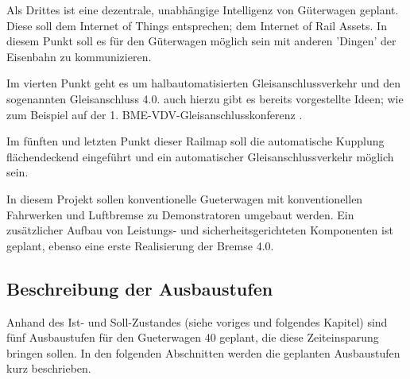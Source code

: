 Als Drittes ist eine dezentrale, unabhängige Intelligenz von Güterwagen geplant. Diese soll dem Internet of Things entsprechen; dem Internet of Rail Assets. In diesem Punkt soll es für den Güterwagen möglich sein mit anderen 'Dingen' der Eisenbahn zu kommunizieren.\par
Im vierten Punkt geht es um halbautomatisierten Gleisanschlussverkehr und den sogenannten Gleisanschluss 4.0. auch hierzu gibt es bereits vorgestellte Ideen; wie zum Beispiel auf der 1. BME-VDV-Gleisanschlusskonferenz \cite{GAK}. \par
Im fünften und letzten Punkt dieser Railmap soll die automatische Kupplung flächendeckend eingeführt und ein automatischer Gleisanschlussverkehr möglich sein.\par
In diesem Projekt sollen \gls{konventionelle Gueterwagen} mit konventionellen Fahrwerken und Luftbremse zu \gls{Demonstrator}en umgebaut werden. Ein zusätzlicher Aufbau von Leistungs- und sicherheitsgerichteten Komponenten ist geplant, ebenso eine erste Realisierung der Bremse 4.0\cite{Stephenson, ETR_2}.\par

\subsection{Beschreibung der Ausbaustufen}\label{sec:Ausbaustufen}
Anhand des Ist- und Soll-Zustandes (siehe voriges und folgendes Kapitel) sind fünf Ausbaustufen für den \gls{Gueterwagen 40} geplant, die diese Zeiteinsparung bringen sollen. In den folgenden Abschnitten werden die geplanten Ausbaustufen kurz beschrieben.\par

